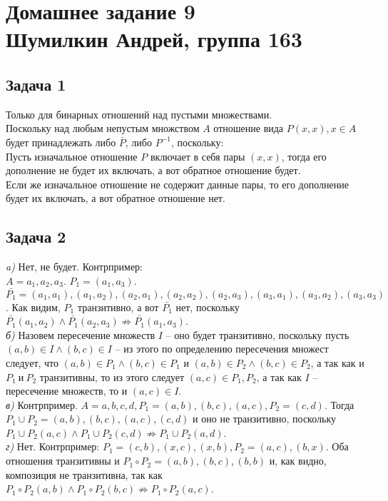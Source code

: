 

	\section{Домашнее задание 9\\ Шумилкин Андрей, группа 163} 
	\subsection{Задача 1}
	Только для бинарных отношений над пустыми множествами.\\
	Поскольку над любым непустым множством $A$ отношение вида $P(x, x), x \in A$ будет принадлежать либо $\bar{P}$, либо $P^{-1}$, поскольку: \\
	Пусть изначальное отношение $P$ включает в себя пары $(x,x)$, тогда его дополнение не будет их включать, а вот обратное отношение будет. \\
	Если же изначальное отношение не содержит данные пары, то его дополнение будет их включать, а вот обратное отношение нет. 
	\subsection{Задача 2}
	\textit{a)} Нет, не будет. Контрпример: \\
	$A = {a_1, a_2, a_3}$. $P_1 = {(a_1, a_3)}$. $\bar{P_1} = {(a_1, a_1), (a_1, a_2), (a_2, a_1), (a_2, a_2), (a_2, a_3), (a_3, a_1), (a_3, a_2), (a_3, a_3)}$.
	Как видим, $P_1$ транзитивно, а вот $\bar{P_1}$ нет, поскольку $\bar{P_1}(a_1, a_2) \land \bar{P_1}(a_2, a_3) \not\Rightarrow \bar{P_1}(a_1, a_3)$.\\
	\textit{б)} Назовем пересечение множеств $I$ -- оно будет транзитивно, поскольку пусть $(a, b) \in I \land (b, c) \in I$ -- из этого по определению пересечения множест следует, что $(a, b) \in P_1 \land (b, c) \in P_1$ и $(a, b) \in P_2 \land (b, c) \in P_2$, а так как и $P_1\ и\ P_2$ транзитивны, то из этого следует $(a,c) \in P_1, P_2$, а так как $I$ -- пересечение множеств, то и $(a,c) \in I$.\\
	\textit{в)} Контрпример. $A = {a, b, c, d}, P_1 = {(a, b), (b, c), (a, c)}, P_2 = {(c, d)}$. Тогда $P_1 \cup P_2 = {(a, b), (b, c), (a, c), (c, d)}$ и оно не транзитивно, поскольку $P_1 \cup P_2(a,c) \land P_1 \cup P_2(c,d) \not\Rightarrow P_1 \cup P_2(a,d)$.\\
	\textit{г)} Нет. Контрпример: $P_1 = {(c, b), (x, c), (x, b)}, P_2 = {(a, c), (b, x)}$. Оба отношения транзитивны и $P_1 \circ P_2 = {(a, b), (b, c), (b, b)}$ и, как видно, композиция не транзитивна, так как  $P_1 \circ P_2(a, b) \land P_1 \circ P_2(b, c) \not\Rightarrow P_1 \circ P_2(a,c)$.
	
